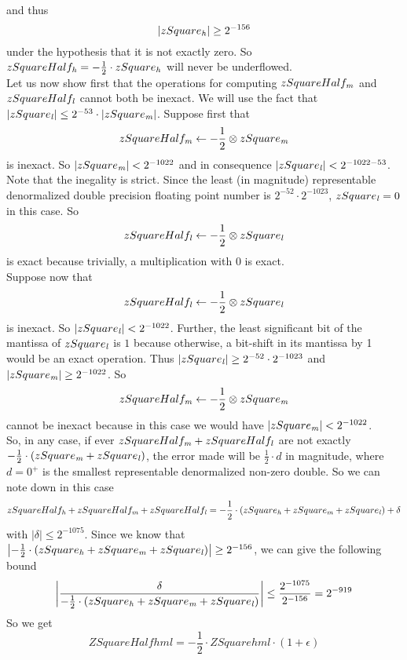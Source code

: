and thus
$$\left \vert zSquare_{\mathit{h}} \right \vert \geq 2^{-156}$$ under the hypothesis that it is not exactly zero.
So $zSquareHalf_{\mathit{h}} = -\frac{1}{2} \cdot zSquare_{\mathit{h}}$ will never be underflowed.\\
Let us now show first that the operations for computing $zSquareHalf_{\mathit{m}}$ and $zSquareHalf_{\mathit{l}}$ cannot both be
inexact. We will use the fact that $\left \vert zSquare_{\mathit{l}} \right \vert \leq 2^{-53} \cdot \left \vert zSquare_{\mathit{m}} \right \vert$.
Suppose first that 
$$zSquareHalf_{\mathit{m}} \gets - \frac{1}{2} \otimes zSquare_{\mathit{m}}$$ is inexact. So $\left \vert zSquare_{\mathit{m}} \right \vert < 2^{-1022}$ and
in consequence $\left \vert zSquare_{\mathit{l}} \right \vert < 2^{-1022-53}$. Note that the inegality is strict. 
Since the least (in magnitude) representable denormalized double precision floating point number is $2^{-52} \cdot 2^{-1023}$,
$zSquare_{\mathit{l}} = 0$ in this case. So $$zSquareHalf_{\mathit{l}} \gets - \frac{1}{2} \otimes zSquare_{\mathit{l}}$$ is exact because trivially, a 
multiplication with $0$ is exact. \\
Suppose now that $$zSquareHalf_{\mathit{l}} \gets - \frac{1}{2} \otimes zSquare_{\mathit{l}}$$ is inexact. 
So $\left \vert zSquare_{\mathit{l}} \right \vert < 2^{-1022}$. Further, the least significant bit of the mantissa of $zSquare_{\mathit{l}}$ is 
$1$ because otherwise, a bit-shift in its mantissa by 1 would be an exact operation. 
Thus $\left \vert zSquare_{\mathit{l}} \right \vert \geq 2^{-52} \cdot 2^{-1023}$ and $\left \vert zSquare_{\mathit{m}} \right \vert \geq 2^{-1022}$. So
$$zSquareHalf_{\mathit{m}} \gets - \frac{1}{2} \otimes zSquare_{\mathit{m}}$$ cannot be inexact because in this case we would have 
$\left \vert zSquare_{\mathit{m}} \right \vert < 2^{-1022}$. \\
So, in any case, if ever $zSquareHalf_{\mathit{m}} + zSquareHalf_{\mathit{l}}$ are not exactly 
$-\frac{1}{2} \cdot \left( zSquare_{\mathit{m}} + zSquare_{\mathit{l}} \right)$, the error made will be $\frac{1}{2} \cdot d$
in magnitude, where $d = 0^+$ is the smallest representable denormalized non-zero double. So we can note down in this case
$$zSquareHalf_{\mathit{h}} + zSquareHalf_{\mathit{m}} + zSquareHalf_{\mathit{l}} = - \frac{1}{2} \cdot \left( zSquare_{\mathit{h}} + zSquare_{\mathit{m}} + zSquare_{\mathit{l}} \right) + \delta$$
with $\left \vert \delta \right \vert \leq 2^{-1075}$. Since we know that
$\left \vert - \frac{1}{2} \cdot \left( zSquare_{\mathit{h}} + zSquare_{\mathit{m}} + zSquare_{\mathit{l}} \right) \right \vert \geq 2^{-156}$, we can give the
following bound
$$\left \vert \frac{\delta}{-\frac{1}{2} \cdot \left( zSquare_{\mathit{h}} + zSquare_{\mathit{m}} + zSquare_{\mathit{l}} \right)} \right \vert \leq 
\frac{2^{-1075}}{2^{-156}} = 2^{-919}$$
So we get
$$ZSquareHalfhml = - \frac{1}{2} \cdot ZSquarehml \cdot \left(1 + \epsilon\right)$$
